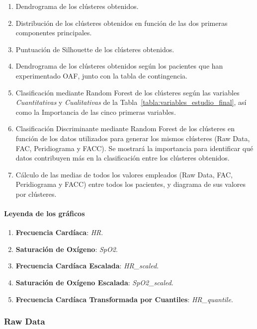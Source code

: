 \begin{enumerate}
    \item Dendrograma de los clústeres obtenidos.
    \item Distribución de los clústeres obtenidos en función de las dos primeras componentes principales.
    \item Puntuación de Silhouette de los clústeres obtenidos.
    \item Dendrograma de los clústeres obtenidos según los pacientes que han experimentado OAF, junto con la tabla de contingencia.
    \item Clasificación mediante Random Forest de los clústeres según las variables \textit{Cuantitativas} y \textit{Cualitativas} de la Tabla~\ref{tabla:variables_estudio_final}, así como la Importancia de las cinco primeras variables.
    \item Clasificación Discriminante mediante Random Forest de los clústeres en función de los datos utilizados para generar los mismos clústeres (Raw Data, FAC, Peridiograma y FACC). Se mostrará la importancia para identificar qué datos contribuyen más en la clasificación entre los clústeres obtenidos.
    \item Cálculo de las medias de todos los valores empleados (Raw Data, FAC, Peridiograma y FACC) entre todos los pacientes, y diagrama de sus valores por clústeres.
\end{enumerate}

\paragraph{Leyenda de los gráficos}

\begin{enumerate}
    \item \textbf{Frecuencia Cardíaca}: \textit{HR}.
    \item \textbf{Saturación de Oxígeno}: \textit{SpO2}.
    \item \textbf{Frecuencia Cardíaca Escalada}: \textit{HR\_scaled}.
    \item \textbf{Saturación de Oxígeno Escalada}: \textit{SpO2\_scaled}.
    \item \textbf{Frecuencia Cardíaca Transformada por Cuantiles}: \textit{HR\_quantile}.
\end{enumerate}


\subsubsection{Raw Data}

